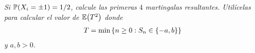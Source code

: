 \emph{
	Si $\mathbb{P}\! \left( X_i=\pm 1 \right)=1/2$, calcule las primeras $4$ martingalas resultantes.
    Util\'icelas para calcular el valor de $\mathbb{E}\! \left( T^2 \right)$ donde
    \null
	\begin{align}
		T=\min\left\{ n\geq 0: S_n\in\left\{ -a,b\right\} \right\} 
	\end{align}
    \null
    y $a,b>0$.
}

\afterstatement\par\null